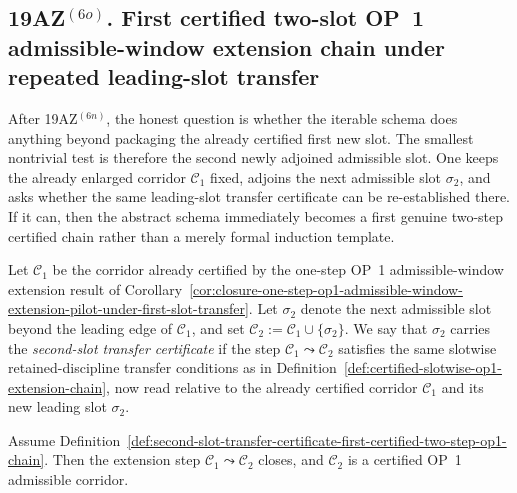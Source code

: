 \subsection*{19AZ$^{(6o)}$. First certified two-slot OP~1 admissible-window extension chain under repeated leading-slot transfer}
\label{sec:first-certified-two-slot-op1-admissible-window-extension-chain-under-repeated-leading-slot-transfer}
After 19AZ$^{(6n)}$, the honest question is whether the iterable schema does anything beyond packaging the already certified first new slot. The smallest nontrivial test is therefore the second newly adjoined admissible slot. One keeps the already enlarged corridor $\mathcal C_1$ fixed, adjoins the next admissible slot $\sigma_2$, and asks whether the same leading-slot transfer certificate can be re-established there. If it can, then the abstract schema immediately becomes a first genuine two-step certified chain rather than a merely formal induction template.

\begin{definition}
\label{def:second-slot-transfer-certificate-first-certified-two-step-op1-chain}
Let $\mathcal C_1$ be the corridor already certified by the one-step OP~1 admissible-window extension result of Corollary~\ref{cor:closure-one-step-op1-admissible-window-extension-pilot-under-first-slot-transfer}. Let $\sigma_2$ denote the next admissible slot beyond the leading edge of $\mathcal C_1$, and set $\mathcal C_2:=\mathcal C_1\cup\{\sigma_2\}$. We say that $\sigma_2$ carries the \emph{second-slot transfer certificate} if the step $\mathcal C_1\leadsto \mathcal C_2$ satisfies the same slotwise retained-discipline transfer conditions as in Definition~\ref{def:certified-slotwise-op1-extension-chain}, now read relative to the already certified corridor $\mathcal C_1$ and its new leading slot $\sigma_2$.
\end{definition}

\begin{proposition}
\label{prop:second-newly-adjoined-admissible-slot-closes-under-repeated-leading-slot-transfer-certificate}
Assume Definition~\ref{def:second-slot-transfer-certificate-first-certified-two-step-op1-chain}. Then the extension step $\mathcal C_1\leadsto \mathcal C_2$ closes, and $\mathcal C_2$ is a certified OP~1 admissible corridor.
\end{proposition}

